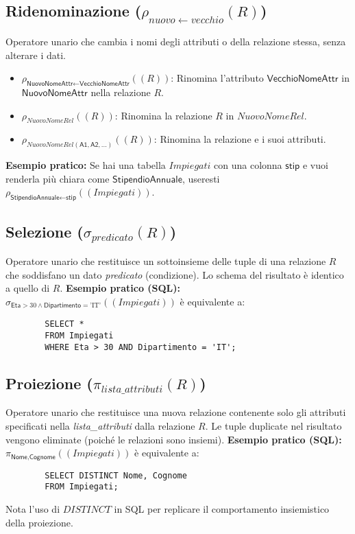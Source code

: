 \documentclass{article}
\newcommand{\Rel}[1]{\textit{#1}} %
\newcommand{\Attr}[1]{\textsf{#1}} %
\newcommand{\myrename}[2]{\rho_{#1}(#2)}
\newcommand{\myselectop}[2]{\sigma_{#1}(#2)}
\newcommand{\myproject}[2]{\pi_{#1}(#2)}
\newcommand{\mylandop}{\wedge}
\begin{document}
	\subsection{Ridenominazione ($\myrename{nuovo \leftarrow vecchio}{R}$)}
	Operatore unario che cambia i nomi degli attributi o della relazione stessa, senza alterare i dati.
	\begin{itemize}
		\item $\myrename{\Attr{NuovoNomeAttr} \leftarrow \Attr{VecchioNomeAttr}}{(\Rel{R})}$: Rinomina l'attributo $\Attr{VecchioNomeAttr}$ in $\Attr{NuovoNomeAttr}$ nella relazione $\Rel{R}$.
		\item $\myrename{\Rel{NuovoNomeRel}}{(\Rel{R})}$: Rinomina la relazione $\Rel{R}$ in $\Rel{NuovoNomeRel}$.
		\item $\myrename{\Rel{NuovoNomeRel}(\Attr{A1}, \Attr{A2}, \dots)}{(\Rel{R})}$: Rinomina la relazione e i suoi attributi.
	\end{itemize}
	\textbf{Esempio pratico:} Se hai una tabella $\Rel{Impiegati}$ con una colonna $\Attr{stip}$ e vuoi renderla più chiara come $\Attr{StipendioAnnuale}$, useresti $\myrename{\Attr{StipendioAnnuale} \leftarrow \Attr{stip}}{(\Rel{Impiegati})}$.
	
	\subsection{Selezione ($\myselectop{predicato}{R}$)}
	Operatore unario che restituisce un sottoinsieme delle tuple di una relazione $\Rel{R}$ che soddisfano un dato \textit{predicato} (condizione).
	Lo schema del risultato è identico a quello di $\Rel{R}$.
	\textbf{Esempio pratico (SQL):}
	$\myselectop{\Attr{Eta} > 30 \mylandop \Attr{Dipartimento} = \text{'IT'}}{(\Rel{Impiegati})}$
	è equivalente a:
	\begin{verbatim}
		SELECT *
		FROM Impiegati
		WHERE Eta > 30 AND Dipartimento = 'IT';
	\end{verbatim}
	
	\subsection{Proiezione ($\myproject{lista\_attributi}{R}$)}
	Operatore unario che restituisce una nuova relazione contenente solo gli attributi specificati nella \textit{lista\_attributi} dalla relazione $\Rel{R}$.
	Le tuple duplicate nel risultato vengono eliminate (poiché le relazioni sono insiemi).
	\textbf{Esempio pratico (SQL):}
	$\myproject{\Attr{Nome}, \Attr{Cognome}}{(\Rel{Impiegati})}$
	è equivalente a:
	\begin{verbatim}
		SELECT DISTINCT Nome, Cognome
		FROM Impiegati;
	\end{verbatim}
	Nota l'uso di $DISTINCT$ in SQL per replicare il comportamento insiemistico della proiezione.
	
\end{document}
